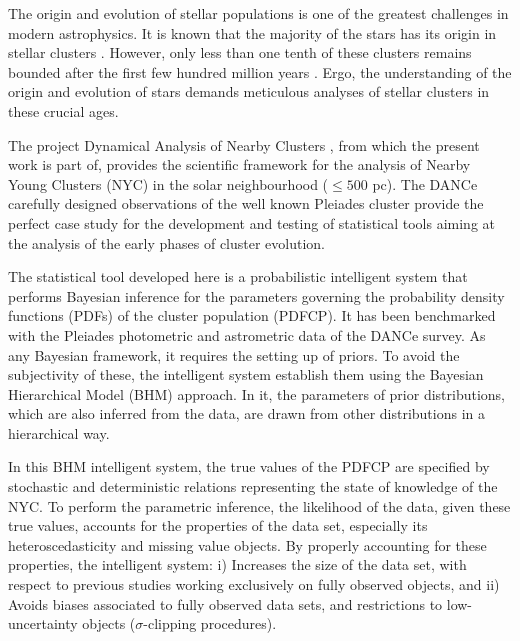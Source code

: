 

The origin and evolution of stellar populations is one of the greatest challenges in modern astrophysics. It is known that the majority of the stars has its origin in stellar clusters \citep{2000AJ....120.3139C, 2003AJ....126.1916P,2003ARA&A..41...57L}. However, only less than one tenth of these clusters remains bounded after the first few hundred million years \citep{2003ARA&A..41...57L}. Ergo, the understanding of the origin and evolution of stars demands meticulous analyses of stellar clusters in these crucial ages.

The project Dynamical Analysis of Nearby Clusters \cite[DANCe,][]{Bouy2013}, from which the present work is part of, provides the scientific framework for the analysis of Nearby Young Clusters (NYC) in the solar neighbourhood ($\leq 500$ pc). The DANCe carefully designed observations of the well known Pleiades cluster provide the perfect case study for the development and testing of statistical tools aiming at the analysis of the early phases of cluster evolution.

The statistical tool developed here is a probabilistic intelligent system that performs Bayesian inference for the parameters governing the probability density functions (PDFs) of the cluster population (PDFCP). It has been benchmarked with the Pleiades photometric and astrometric data of the DANCe survey. As any Bayesian framework, it requires the setting up of priors. To avoid the subjectivity of these, the intelligent system establish them using the Bayesian Hierarchical Model (BHM) approach. In it, the parameters of prior distributions, which are also inferred from the data, are drawn from other distributions in a hierarchical way. 

In this BHM intelligent system, the true values of the PDFCP are specified by stochastic and deterministic relations representing the state of knowledge of the NYC. To perform the parametric inference, the likelihood of the data, given these true values, accounts for the properties of the data set, especially its heteroscedasticity and missing value objects. By properly accounting for these properties, the intelligent system: i) Increases the size of the data set, with respect to previous studies working exclusively on fully observed objects, and ii) Avoids biases associated to fully observed data sets, and restrictions to low-uncertainty objects ($\sigma$-clipping procedures).

